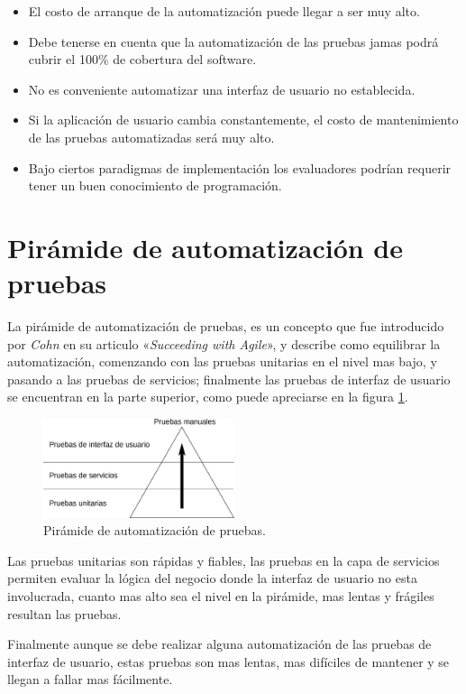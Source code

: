 \begin{itemize}
    \item El costo de arranque de la automatización puede llegar a ser muy alto.
    \item Debe tenerse en cuenta que la automatización de las pruebas jamas
        podrá cubrir el 100\% de cobertura del software.
    \item No es conveniente automatizar una interfaz de usuario no establecida.
    \item Si la aplicación de usuario cambia constantemente, el costo de
        mantenimiento de las pruebas automatizadas será muy alto.
    \item Bajo ciertos paradigmas de implementación los evaluadores podrían
        requerir tener un buen conocimiento de programación.
\end{itemize}

\section{Pirámide de automatización de pruebas}
La pirámide de automatización de pruebas, es un concepto que fue introducido
por \emph{Cohn} en su articulo «\emph{Succeeding with Agile}», y describe como
equilibrar la automatización, comenzando con las pruebas unitarias en el nivel
mas bajo, y pasando a las pruebas de servicios; finalmente las pruebas de
interfaz de usuario se encuentran en la parte superior, como puede apreciarse en
la figura \ref{piramide}.

\begin{figure}[H]
\centering
\includegraphics[width=0.5\textwidth]{graphics/pyramid.eps}
\caption{Pirámide de automatización de pruebas.}
\label{piramide}
\end{figure}

Las pruebas unitarias son rápidas y fiables, las pruebas en la capa de servicios
permiten evaluar la lógica del negocio donde la interfaz de usuario no esta
involucrada, cuanto mas alto sea el nivel en la pirámide, mas lentas y frágiles
resultan las pruebas.

Finalmente aunque se debe realizar alguna automatización de las pruebas de
interfaz de usuario, estas pruebas son mas lentas, mas difíciles de mantener y
se llegan a fallar mas fácilmente.

